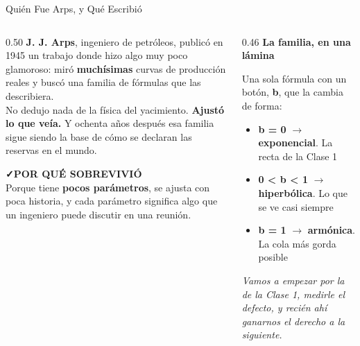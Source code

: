 \documentclass[aspectratio=169, 11pt]{beamer}
\begin{document}
\begin{frame}[shrink=16]{Quién Fue Arps, y Qué Escribió}
  \vspace{-4pt}
  \begin{columns}[T]
    \begin{column}{0.50\textwidth}
      {\footnotesize\color{textMuted}
      \textbf{J. J. Arps}, ingeniero de petróleos, publicó en 1945 un trabajo
      donde hizo algo muy poco glamoroso: miró \textbf{muchísimas} curvas de
      producción reales y buscó una familia de fórmulas que las describiera.\\[6pt]
      No dedujo nada de la física del yacimiento. \textbf{Ajustó lo que veía.}
      Y ochenta años después esa familia sigue siendo la base de cómo se
      declaran las reservas en el mundo.}
      \vspace{7pt}
      \begin{tcolorbox}[colback=arcaGray, colframe=codeGreen, boxrule=0pt, leftrule=3pt,
        arc=3pt, left=6pt, right=6pt, top=4pt, bottom=4pt]
        {\scriptsize\color{codeGreen}\bfseries\faCheck\hspace{4pt}POR QUÉ SOBREVIVIÓ}\\[3pt]
        {\scriptsize\color{textMuted}
         Porque tiene \textbf{pocos parámetros}, se ajusta con poca historia,
         y cada parámetro significa algo que un ingeniero puede discutir en
         una reunión.}
      \end{tcolorbox}
    \end{column}
    \begin{column}{0.46\textwidth}
      {\small\color{arcaDark}\bfseries\faSitemap\hspace{5pt}La familia, en una lámina}
      \vspace{5pt}
      {\footnotesize\color{textMuted}
      Una sola fórmula con un botón, \textbf{b}, que la cambia de forma:
      \vspace{5pt}
      \begin{itemize}\setlength{\itemsep}{5pt}
        \item[{\color{arcaRed}\scriptsize\faCircle}]
          \textbf{b = 0} $\rightarrow$ \textbf{exponencial}.
          La recta de la Clase 1
        \item[{\color{codeBlue}\scriptsize\faCircle}]
          \textbf{0 < b < 1} $\rightarrow$ \textbf{hiperbólica}.
          Lo que se ve casi siempre
        \item[{\color{codeGreen}\scriptsize\faCircle}]
          \textbf{b = 1} $\rightarrow$ \textbf{armónica}.
          La cola más gorda posible
      \end{itemize}}
      \vspace{6pt}
      {\scriptsize\color{arcaDark}\itshape
        Vamos a empezar por la de la Clase 1, medirle el defecto,
        y recién ahí ganarnos el derecho a la siguiente.}
    \end{column}
  \end{columns}
\end{frame}
\end{document}
